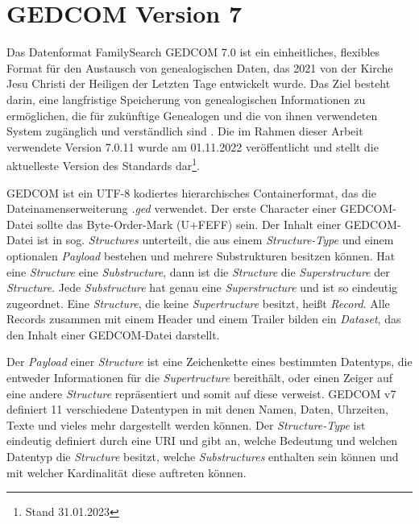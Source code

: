 \section{GEDCOM Version 7}
{
\label{sec: GEDCOM Version 7}
Das Datenformat FamilySearch GEDCOM 7.0 ist ein einheitliches, flexibles Format für den Austausch von genealogischen Daten, das 2021 von der Kirche Jesu Christi der Heiligen der Letzten Tage entwickelt wurde. Das Ziel besteht darin, eine langfristige Speicherung von genealogischen Informationen zu ermöglichen, die für zukünftige Genealogen und die von ihnen verwendeten System zugänglich und verständlich sind \cite{GEDCOM}. Die im Rahmen dieser Arbeit verwendete Version 7.0.11 wurde am 01.11.2022 veröffentlicht und stellt die aktuelleste Version des Standards dar\footnote{Stand 31.01.2023}. 

GEDCOM ist ein UTF-8 kodiertes hierarchisches Containerformat, das die Dateinamenserweiterung \textit{.ged} verwendet. Der erste Character einer GEDCOM-Datei sollte das Byte-Order-Mark (U+FEFF) sein. Der Inhalt einer GEDCOM-Datei ist in sog. \textit{Structures} unterteilt, die aus einem \textit{Structure-Type} und einem optionalen \textit{Payload} bestehen und mehrere Substrukturen besitzen können. Hat eine \textit{Structure} eine \textit{Substructure}, dann ist die \textit{Structure} die \textit{Superstructure} der \textit{Structure}. Jede \textit{Substructure} hat genau eine \textit{Superstructure} und ist so eindeutig zugeordnet. Eine \textit{Structure}, die keine \textit{Supertructure} besitzt, heißt \textit{Record}. Alle Records zusammen mit einem Header und einem Trailer bilden ein \textit{Dataset}, das den Inhalt einer GEDCOM-Datei darstellt. \cite{GEDCOM} 

Der \textit{Payload} einer \textit{Structure} ist eine Zeichenkette eines bestimmten Datentyps, die entweder Informationen für die \textit{Supertructure} bereithält, oder einen Zeiger auf eine andere \textit{Structure} repräsentiert und somit auf diese verweist. GEDCOM v7 definiert 11 verschiedene Datentypen in \cite{GEDCOM} mit denen Namen, Daten, Uhrzeiten, Texte und vieles mehr dargestellt werden können. Der \textit{Structure-Type} ist eindeutig definiert durch eine URI und gibt an, welche Bedeutung und welchen Datentyp die \textit{Structure} besitzt, welche \textit{Substructures} enthalten sein können und mit welcher Kardinalität diese auftreten können. \cite{GEDCOM} 

}
